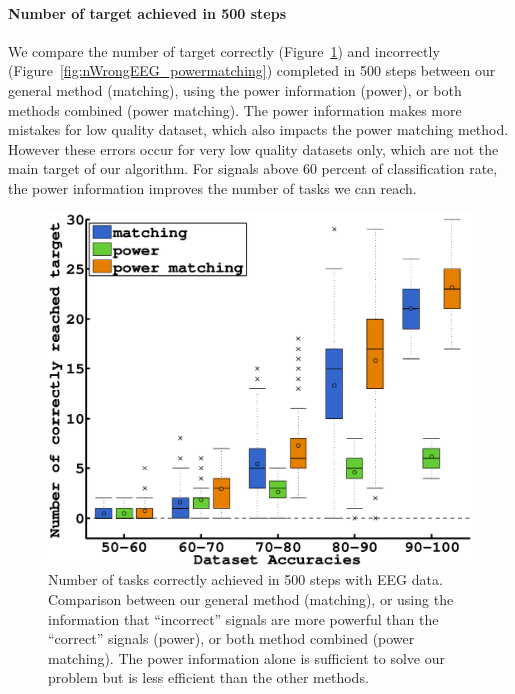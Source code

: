 \paragraph{Number of target achieved in 500 steps}

We compare the number of target correctly (Figure~\ref{fig:nCorrect_powermatching}) and incorrectly (Figure~\ref{fig:nWrongEEG_powermatching}) completed in 500 steps between our general method (matching), using the power information (power), or both methods combined (power matching). The power information makes more mistakes for low quality dataset, which also impacts the power matching method. However these errors occur for very low quality datasets only, which are not the main target of our algorithm. For signals above 60 percent of classification rate, the power information improves the number of tasks we can reach.

\begin{figure}[!htbp]
\centering
\includegraphics[width=\columnwidth]{figures/power/correct.eps}
\caption{Number of tasks correctly achieved in 500 steps with EEG data. Comparison between our general method (matching), or using the information that ``incorrect'' signals are more powerful than the ``correct'' signals (power), or both method combined (power matching). The power information alone is sufficient to solve our problem but is less efficient than the other methods.}
\label{fig:nCorrect_powermatching}
\end{figure} 

